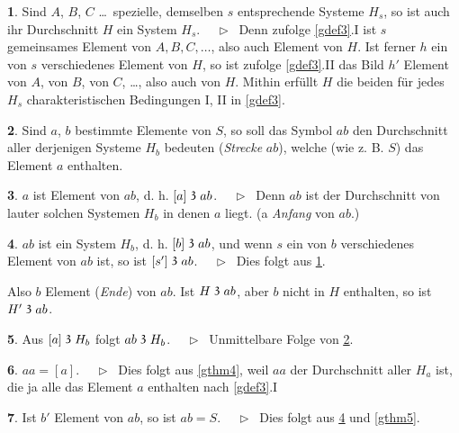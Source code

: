 \documentclass[leqno,hidelinks]{article}
\theoremstyle{definition}
\newtheorem{satz}{\protect\satzname}
\newtheorem{deff}[satz]{\protect\deffname}
\newcommand{\satzname}{}
\newcommand{\deffname}{}
\renewcommand{\satzname}{\hspace{-4pt}.\ Satz}%
\renewcommand{\deffname}{\hspace{-4pt}.\ Definition}%
\renewcommand{\satzname}{\hspace{-4pt}.\ Theorem}%
\renewcommand{\deffname}{\hspace{-4pt}.\ Definition}%
\newcommand\Beweis{\medskip \newline $ \phantom{'.'} \rhd \ $}%
\newcommand\TeilVon{\mathrel{\raisebox{0.45ex}{$\mathfrak{3}$}}}
\newcommand{\sref}[1]{\underline{\ref{#1}}}%
\begin{document}
\begin{paracol}{2}
\begin{satz}\label{gthm8}
Sind $A$, $B$, $C$ \ldots\ spezielle, demselben $s$ entsprechende Systeme $H_s$,
so ist auch ihr Durchschnitt $H$ ein System $H_s$.
\Beweis
Denn zufolge \sref{gdef3}{\color{ultrav}.I} ist $s$ gemeinsames Element von
$A, B, C, \ldots$, also auch Element von $H$. Ist ferner $h$ ein von $s$
verschiedenes Element von $H$, so ist zufolge \sref{gdef3}{\color{ultrav}.II} das
Bild $h'$ Element von $A$, von $B$, von $C$, \ldots, also auch von $H$. Mithin
erfüllt $H$ die beiden für jedes $H_s$ charakteristischen Bedingungen I, II
in \sref{gdef3}.
\end{satz}

\begin{deff}\label{gdef9}
Sind $a$, $b$ bestimmte Elemente von $S$, so soll das Symbol $ab$ den Durchschnitt
aller derjenigen Systeme $H_b$ bedeuten (\emph{Strecke} $ab$), welche (wie z. B. $S$)
das Element $a$ enthalten.
\end{deff}

\newpage

\begin{satz}\label{gthm10}
$a$ ist Element von $ab$, d. h. $[a] \TeilVon ab$.
\Beweis
Denn $ab$ ist der Durchschnitt von lauter solchen Systemen $H_b$ in denen $a$
liegt. (a \emph{Anfang} von $ab$.)
\end{satz}

\begin{satz}\label{gthm11}
$ab$ ist ein System $H_b$, d. h. $[b] \TeilVon ab$, und wenn $s$ ein von $b$
verschiedenes Element von $ab$ ist, so ist $[s'] \TeilVon ab$.
\Beweis
Dies folgt aus \sref{gthm8}.
\end{satz}

Also $b$ Element (\emph{Ende}) von $ab$. Ist $H \TeilVon ab$, aber $b$ nicht in
$H$ enthalten, so ist $H' \TeilVon ab$.

\begin{satz}\label{gthm12}
Aus $[a] \TeilVon H_b$ folgt $ab \TeilVon H_b$.
\Beweis
Unmittelbare Folge von \sref{gdef9}.
\end{satz}

\begin{satz}\label{gthm13}
$aa = [a]$.
\Beweis
Dies folgt aus \sref{gthm4}, weil $aa$ der Durchschnitt aller $H_a$  ist, die
ja alle das Element $a$ enthalten nach \sref{gdef3}.I
\end{satz}

\begin{satz}\label{gthm14}
Ist $b'$ Element von $ab$, so ist $ab = S$.
\Beweis
Dies folgt aus \sref{gthm11} und \sref{gthm5}.
\end{satz}


\end{paracol}
\end{document}
